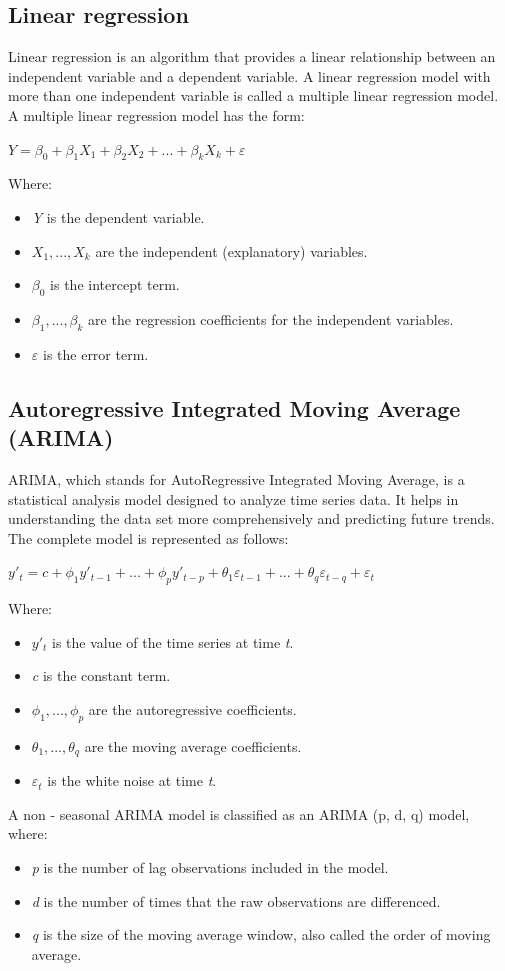 \documentclass{ieeeojies}
\begin{document}
\subsection{Linear regression}
Linear regression is an algorithm that provides a linear relationship between an independent variable and a dependent variable. A linear regression model with more than one independent variable is called a multiple linear regression model. A multiple linear regression model has the form:
\newline  \centerline{$\textit{Y} = \beta_{0} + \beta_{1}X_{1} + \beta_{2}X_{2} + ... + \beta_{k}X_{k} + \varepsilon$}
\newline Where:
\begin{itemize}
	\item \textit{Y} is the dependent variable.
	\item $X_{1},...,X_{k}$ are the independent (explanatory) variables.
	\item $\beta_{0}$ is the intercept term.
	\item $\beta_{1},...,\beta_{k}$ are the regression coefficients for the independent variables.
	\item $\varepsilon$ is the error term.
\end{itemize}

\subsection{Autoregressive Integrated Moving Average (ARIMA)}
ARIMA, which stands for AutoRegressive Integrated Moving Average, is a statistical analysis model designed to analyze time series data. It helps in understanding the data set more comprehensively and predicting future trends. The complete model is represented as follows:
\newline \centerline{$y'_{t} = c + \phi_{1}y'_{t-1} + ... + \phi_{p}y'_{t-p} + \theta_{1}\varepsilon_{t-1} + ... + \theta_{q}\varepsilon_{t-q} + \varepsilon_{t}$}
\newline Where:
\begin{itemize}
	\item $y'_{t}$ is the value of the time series at time \textit{t}.
	\item \textit{c} is the constant term.
	\item $\phi_{1},...,\phi_{p}$ are the autoregressive coefficients.
	\item $\theta_{1},...,\theta_{q}$ are the moving average coefficients.
	\item $\varepsilon_{t}$ is the white noise at time \textit{t}.
\end{itemize}
A non - seasonal ARIMA model is classified as an ARIMA (p, d, q) model, where:
\begin{itemize}
	\item \textit{p} is the number of lag observations included in the model.
	\item \textit{d} is the number of times that the raw observations are differenced.
	\item \textit{q} is the size of the moving average window, also called the order of moving average.
\end{itemize}
\end{document}
